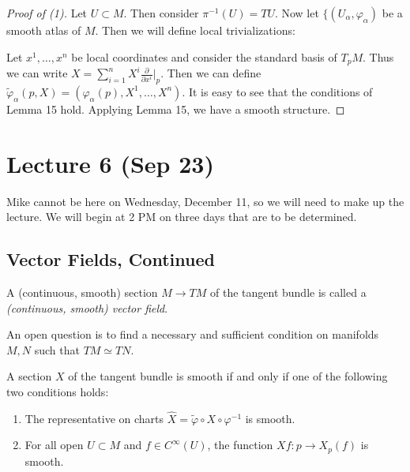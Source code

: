 \documentclass[twoside, 10pt]{article}
\begin{document}
    \begin{proof}[Proof of (1)] Let $U \subset M$. Then consider $\pi^{-1}(U) =
        TU$. Now let $\{(U_{\alpha}, \varphi_{\alpha})$ be a smooth atlas of
            $M$. Then we will define local trivializations:
        
            Let $x^1, \ldots, x^n$ be local coordinates and consider the
        standard basis of $T_pM$. Thus we can write $X = \sum_{i=1}^n X^i
    \frac{\partial}{\partial x^i} \big\vert_p$. Then we can define
$\widetilde{\varphi}_{\alpha}(p,X) = (\varphi_{\alpha}(p), X^1, \ldots, X^n)$.
It is easy to see that the conditions of Lemma 15 hold. Applying Lemma 15, we
have a smooth structure.  \end{proof}

    \section{Lecture 6 (Sep 23)}%
    
    Mike cannot be here on Wednesday, December 11, so we will need to make up
    the lecture. We will begin at 2 PM on three days that are to be determined.

    \subsection{Vector Fields, Continued}%
    
    \begin{defn} A (continuous, smooth) section $M \to TM$ of the tangent
    bundle is called a \textit{(continuous, smooth) vector field}.  \end{defn}
    
    \begin{rmk} An open question is to find a necessary and sufficient
    condition on manifolds $M,N$ such that $TM \simeq TN$.  \end{rmk}
    
    \begin{lem} A section $X$ of the tangent bundle is
        smooth if and only if one of the following two conditions holds:
        \begin{enumerate} \item The representative on charts $\widehat{X} =
            \widetilde{\varphi} \circ X \circ \varphi^{-1}$ is smooth.  \item
    For all open $U \subset M$ and $f \in C^{\infty}(U)$, the function $Xf:p
    \to X_p(f)$ is smooth.  \end{enumerate} \end{lem}
    
\end{document}
